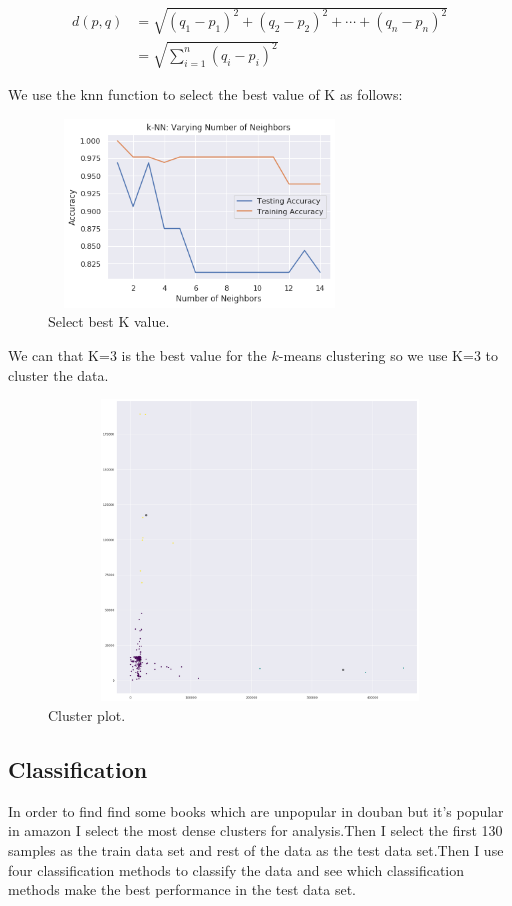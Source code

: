 \documentclass[12pt, a4paper]{article}
\begin{document}
        \begin{equation*}\begin{split}
            d(p,q)&=\sqrt{(q_{1}-p_{1})^2+(q_{2}-p_{2})^2+\cdots+(q_{n}-p_{n})^2}\\
            &=\sqrt{\sum_{i=1}^{n}{(q_{i}-p_{i})^2}}
        \end{split}\end{equation*}


   
   We use the knn function to select the best value of K as follows:

   \begin{figure}[ht]
    \centering
    \includegraphics[width=8cm,height=5cm]{p7.png}
    \caption{Select best K value.}
\end{figure}
   \newpage
   We can that K=3 is the best value for the $k$-means clustering
   so we use K=3 to cluster the data.
   
   

   \begin{figure}[ht]
    \centering
    \includegraphics[width=12cm,height=8cm]{p8.png}
    \caption{Cluster plot.}
\end{figure}
\newpage
\subsection{Classification}
In order to find  find some books which are unpopular 
in douban but it's popular in amazon I select the most 
 dense clusters for analysis.Then I select the first 130
 samples as the train data set and rest of the data as 
 the test data set.Then I use four classification methods\cite{vanderplas2016python} to classify
 the data and see which classification methods make the best performance
 in the test data set.
\end{document}
